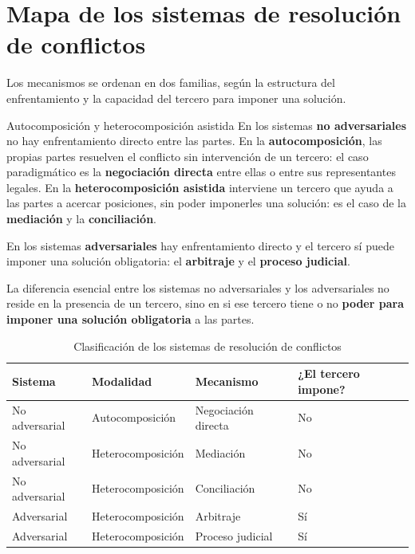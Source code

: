 \documentclass[12pt,oneside]{book}
\begin{document}
\section{Mapa de los sistemas de resolución de conflictos}

Los mecanismos se ordenan en dos familias, según la estructura del enfrentamiento y la capacidad del tercero para imponer una solución.

\begin{definition}{Autocomposición y heterocomposición asistida}
En los sistemas \textbf{no adversariales} no hay enfrentamiento directo entre las partes. En la \textbf{autocomposición}, las propias partes resuelven el conflicto sin intervención de un tercero: el caso paradigmático es la \textbf{negociación directa} entre ellas o entre sus representantes legales. En la \textbf{heterocomposición asistida} interviene un tercero que ayuda a las partes a acercar posiciones, sin poder imponerles una solución: es el caso de la \textbf{mediación} y la \textbf{conciliación}.
\end{definition}

En los sistemas \textbf{adversariales} hay enfrentamiento directo y el tercero sí puede imponer una solución obligatoria: el \textbf{arbitraje} y el \textbf{proceso judicial}.

\begin{important}
La diferencia esencial entre los sistemas no adversariales y los adversariales no reside en la presencia de un tercero, sino en si ese tercero tiene o no \textbf{poder para imponer una solución obligatoria} a las partes.
\end{important}

\begin{table}[H]
\centering
\caption{Clasificación de los sistemas de resolución de conflictos}
\begin{tabularx}{\textwidth}{>{\raggedright\arraybackslash}p{} >{\raggedright\arraybackslash}p{} X >{\raggedright\arraybackslash}p{}}
\toprule
\textbf{Sistema} & \textbf{Modalidad} & \textbf{Mecanismo} & \textbf{¿El tercero impone?} \\
\midrule
No adversarial & Autocomposición & Negociación directa & No \\
No adversarial & Heterocomposición & Mediación & No \\
No adversarial & Heterocomposición & Conciliación & No \\
Adversarial & Heterocomposición & Arbitraje & Sí \\
Adversarial & Heterocomposición & Proceso judicial & Sí \\
\bottomrule
\end{tabularx}
\end{table}
\end{document}
